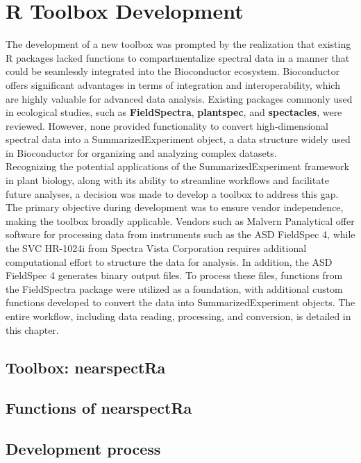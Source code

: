 \documentclass[12pt,a4paper]{report}
\begin{document}
\section{R Toolbox Development}
The development of a new toolbox was prompted by the realization that existing R packages lacked functions to compartmentalize spectral data in a manner that could be seamlessly integrated into the Bioconductor ecosystem. Bioconductor offers significant advantages in terms of integration and interoperability, which are highly valuable for advanced data analysis. 
Existing packages commonly used in ecological studies, such as \textbf{FieldSpectra}, \textbf{plantspec}, and \textbf{spectacles}, were reviewed. However, none provided functionality to convert high-dimensional spectral data into a SummarizedExperiment object, a data structure widely used in Bioconductor for organizing and analyzing complex datasets. \\
Recognizing the potential applications of the SummarizedExperiment framework in plant biology, along with its ability to streamline workflows and facilitate future analyses, a decision was made to develop a toolbox to address this gap. The primary objective during development was to ensure vendor independence, making the toolbox broadly applicable. Vendors 
such as Malvern Panalytical offer software for processing data from instruments such as the ASD FieldSpec 4, while the SVC HR-1024i from Spectra Vista Corporation requires additional computational effort to structure the data for analysis.
In addition, the ASD FieldSpec 4 generates binary output files. To process these files, functions from the FieldSpectra package were utilized as a foundation, with additional custom functions developed to convert the data into SummarizedExperiment objects. The entire workflow, including data reading, processing, and conversion, is detailed in this chapter.\\



\subsection{Toolbox: nearspectRa}
\subsection{Functions of nearspectRa}
\subsection{Development process}
\end{document}
